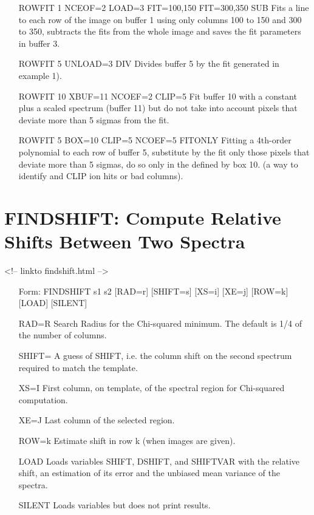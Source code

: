 \begin{itemize}
  \item[ROWFIT 1 NCEOF=2 LOAD=3 FIT=100,150 FIT=300,350 SUB \hfill]{ Fits a
       line to each row of the image on buffer 1 using only columns 100 to
       150 and 300 to 350, subtracts the fits from the whole image and
       saves the fit parameters in buffer 3.}

  \item[ROWFIT 5 UNLOAD=3 DIV\hfill]{ Divides buffer 5 by the fit generated
       in example 1).}

  \item[ROWFIT 10 XBUF=11 NCOEF=2 CLIP=5\hfill]{ Fit buffer 10 with a
       constant plus a scaled spectrum (buffer 11) but do not take into
       account pixels that deviate more than 5 sigmas from the fit.}

  \item[ROWFIT 5 BOX=10 CLIP=5 NCOEF=5 FITONLY\hfill]{ Fitting a 4th-order
       polynomial to each row of buffer 5, substitute by the fit only those
       pixels that deviate more than 5 sigmas, do so only in the defined by
       box 10. (a way to identify and CLIP ion hits or bad columns).}
\end{itemize}

\section{FINDSHIFT: Compute Relative Shifts Between Two Spectra}
\begin{rawhtml}
<!-- linkto findshift.html -->
\end{rawhtml}
\begin{itemize}
  \item[Form: FINDSHIFT s1 s2 {[RAD=r]} {[SHIFT=s]} {[XS=i]} {[XE=j]} 
       {[ROW=k]} {[LOAD]} {[SILENT]}\hfill]{}
  \item[RAD=R]{Search Radius for the Chi-squared minimum.
               The default is 1/4 of the number of columns.}
  \item[SHIFT=]{A guess of SHIFT, i.e. the column shift on the
                second spectrum required to match the template.}
  \item[XS=I]{First column, on template, of the spectral
              region for Chi-squared computation.}
  \item[XE=J]{Last column of the selected region.}
  \item[ROW=k]{Estimate shift in row k (when images are given).}
  \item[LOAD]{Loads variables SHIFT, DSHIFT, and SHIFTVAR with
              the relative shift, an estimation of its error
              and the unbiased mean variance of the spectra.}
  \item[SILENT]{Loads variables but does not print results.}
\end{itemize}

